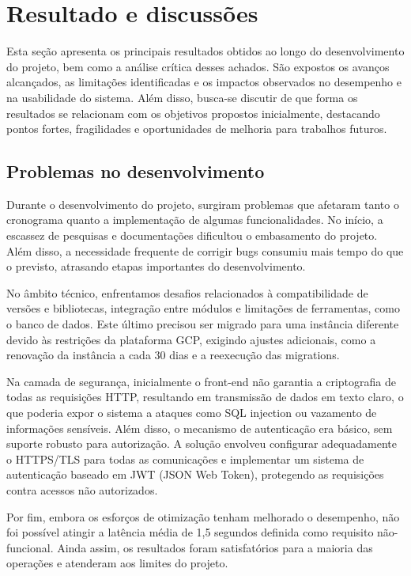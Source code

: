 \documentclass[
	article,			%
	12pt,				%
	oneside,			%
	a4paper,			%
    BIBLATEX,           %
	english,			%
	brazil,				%
	sumario=tradicional
	]{abntex2}
\begin{document}

\section{Resultado e discussões}
Esta seção apresenta os principais resultados obtidos ao longo do desenvolvimento do projeto, bem como a análise crítica desses achados. São expostos os avanços alcançados, as limitações identificadas e os impactos observados no desempenho e na usabilidade do sistema. Além disso, busca-se discutir de que forma os resultados se relacionam com os objetivos propostos inicialmente, destacando pontos fortes, fragilidades e oportunidades de melhoria para trabalhos futuros.

\subsection {Problemas no desenvolvimento}
Durante o desenvolvimento do projeto, surgiram problemas que afetaram tanto o cronograma quanto a implementação de algumas funcionalidades. No início, a escassez de pesquisas e documentações dificultou o embasamento do projeto. Além disso, a necessidade frequente de corrigir bugs consumiu mais tempo do que o previsto, atrasando etapas importantes do desenvolvimento.

No âmbito técnico, enfrentamos desafios relacionados à compatibilidade de versões e bibliotecas, integração entre módulos e limitações de ferramentas, como o banco de dados. Este último precisou ser migrado para uma instância diferente devido às restrições da plataforma GCP, exigindo ajustes adicionais, como a renovação da instância a cada 30 dias e a reexecução das migrations.

Na camada de segurança, inicialmente o front-end não garantia a criptografia de todas as requisições HTTP, resultando em transmissão de dados em texto claro, o que poderia expor o sistema a ataques como SQL injection ou vazamento de informações sensíveis. Além disso, o mecanismo de autenticação era básico, sem suporte robusto para autorização. A solução envolveu configurar adequadamente o HTTPS/TLS para todas as comunicações e implementar um sistema de autenticação baseado em JWT (JSON Web Token), protegendo as requisições contra acessos não autorizados.

Por fim, embora os esforços de otimização tenham melhorado o desempenho, não foi possível atingir a latência média de 1,5 segundos definida como requisito não-funcional. Ainda assim, os resultados foram satisfatórios para a maioria das operações e atenderam aos limites do projeto.
\end{document}
